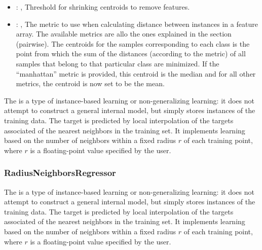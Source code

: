 \begin{itemize}
    \item {}: , 
      Threshold for shrinking centroids to remove features.

    \item {}: , 
      The metric to use when calculating distance between instances in a feature array.
      The available metrics are allo the ones explained in the  section (pairwise).
      The centroids for the samples corresponding to each class is the point from which the sum of
      the distances (according to the metric) of all samples that belong to that particular class
      are                                                  minimized. If the ``manhattan'' metric is
      provided, this centroid is the median and for all other metrics,
      the centroid is now set to be the mean.
  \end{itemize}
 The  is a type of instance-based learning or
 non-generalizing learning: it does not attempt to construct a general internal
 model, but simply stores instances of the training data.                          The target is
 predicted by local interpolation of the targets associated of the                          nearest
 neighbors in the training set.                          It implements learning based on the number
 of neighbors within a fixed radius                          $r$ of each training point, where $r$
 is a floating-point value specified by the                          user.

\subsubsection{RadiusNeighborsRegressor}
  The  is a type of instance-based learning or
  non-generalizing learning: it does not attempt to construct a general internal
  model, but simply stores instances of the training data.                          The target is
  predicted by local interpolation of the targets associated of the                          nearest
  neighbors in the training set.                          It implements learning based on the number
  of neighbors within a fixed radius                          $r$ of each training point, where $r$
  is a floating-point value specified by the                          user.

